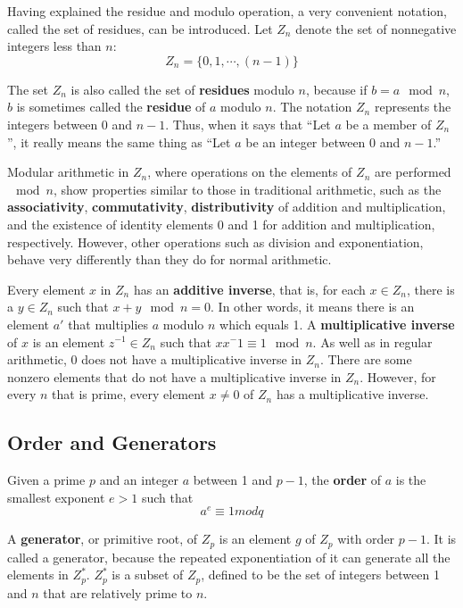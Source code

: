 Having explained the residue and modulo operation, a very convenient notation, called the set of residues, can be introduced. Let $Z_{n}$ denote the set of nonnegative integers less than $n$:
\begin{equation}
Z_{n} = \{0,1,\cdots, (n-1)\}
\end{equation} 

The set $Z_{n}$ is also called the set of \textbf{residues} modulo $n$, because if $b=a \mod n$, $b$ is sometimes called the \textbf{residue} of $a$ modulo $n$. The notation $Z_{n}$ represents the integers between 0 and $n-1$. Thus, when it says that ``Let $a$ be a member of $Z_{n}$'', it really means the same thing as ``Let $a$ be an integer between 0 and $n-1$.''

Modular arithmetic in $Z_{n}$, where operations on the elements of $Z_{n}$ are performed $\mod n$, show properties similar to those in traditional arithmetic, such as the \textbf{associativity}, \textbf{commutativity}, \textbf{distributivity} of addition and multiplication, and the existence of identity elements 0 and 1 for addition and multiplication, respectively. However, other operations such as division and exponentiation, behave very differently than they do for normal arithmetic.

Every element $x$ in $Z_{n}$ has an \textbf{additive inverse}, that is, for each $x \in Z_{n}$, there is a $y \in Z_{n}$ such that $x + y \mod n = 0$. In other words, it means there is an element $a'$ that multiplies $a$ modulo $n$ which equals 1.  A \textbf{multiplicative inverse} of $x$ is an element $z^{-1} \in Z_{n}$ such that $xx^-1 \equiv 1 \mod n$. As well as in regular arithmetic, 0 does not have a multiplicative inverse in $Z_{n}$. There are some nonzero elements that do not have a multiplicative inverse in $Z_{n}$. However, for every $n$ that is prime, every element $x \ne 0$ of $Z_{n}$ has a multiplicative inverse.

\subsection{Order and Generators}

Given a prime $p$ and an integer $a$ between 1 and $p-1$, the \textbf{order} of $a$ is the smallest exponent $e > 1 $ such that
\begin{equation}
  a^{e} \equiv 1 mod q
\end{equation}

A \textbf{generator}, or primitive root, of $Z_{p}$ is an element $g$ of $Z_{p}$ with order $p-1$. It is called a generator, because the repeated exponentiation of it can generate all the elements in $Z_{p}^{*}$. $Z_{p}^{*}$ is a subset of $Z_{p}$, defined to be the set of integers between 1 and $n$ that are relatively prime to $n$. 

